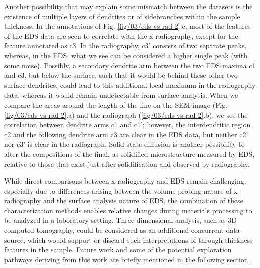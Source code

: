 Another possibility that may explain some mismatch between the datasets is
the existence of multiple layers of dendrites or of sidebranches within
the sample thickness. In the annotations of
Fig. \ref{fig/03/eds-vs-rad-2}.c, most of the features
of the EDS data are seen to correlate with the x-radiography, except for
the feature annotated as c3. In the radiography, c3' consists of two
separate peaks, whereas, in the EDS, what we see can be considered a
higher single peak (with some noise). Possibly, a secondary dendrite arm
between the two EDS maxima c1 and c3, but below the surface, such that it
would be behind these other two surface dendrites, could lead to this
additional local maximum in the radiography data, whereas it would remain
undetectable from surface analysis. When we compare the areas around the
length of the line on the SEM image (Fig. \ref{fig/03/eds-vs-rad-2}.a) and
the radiograph (\ref{fig/03/eds-vs-rad-2}.b),
we see the correlation between dendrite arms c1 and c1'; however, the
interdendritic region c2 and the following dendrite arm c3 are clear in
the EDS data, but neither c2' nor c3' is clear in the radiograph.
Solid-state diffusion is another possibility to alter the compositions of
the final, as-solidified microstructure measured by EDS, relative to those
that exist just after solidification and observed by radiography.

While direct comparisons between x-radiography and EDS remain challenging,
especially due to differences arising between the volume-probing nature of
x-radiography and the surface analysis nature of EDS, the combination of
these characterization methods enables relative changes during materials
processing to be analyzed in a laboratory setting. Three-dimensional
analysis, such as 3D computed tomography, could be considered as an
additional concurrent data source, which would support or discard such
interpretations of through-thickness features in the sample. Future work
and some of the potential exploration pathways deriving from this work are
briefly mentioned in the following section.

